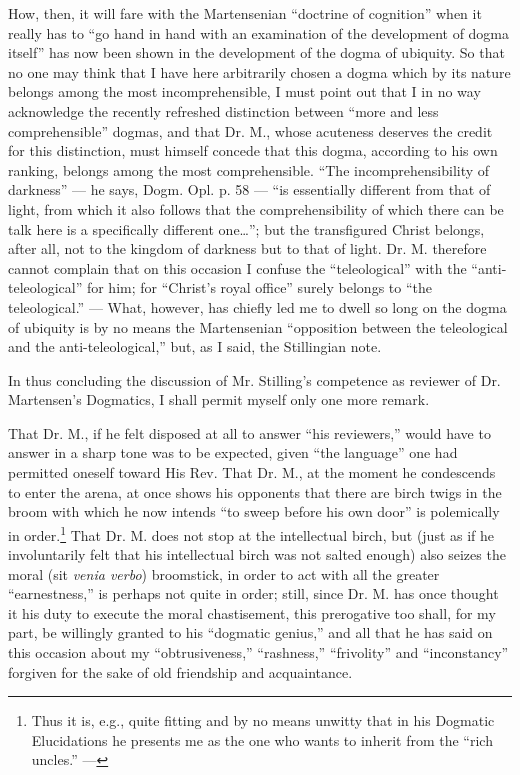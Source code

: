\documentclass[12pt,a4paper,openany]{book}
\newcommand{\opage}[1]{\marginnote{\footnotesize\textit{[#1]}}}
\begin{document}
How, then, it will fare with the Martensenian ``doctrine
of cognition'' when it really has to ``go hand in hand with
an examination of the development of dogma itself'' has now
been shown in the development of the dogma of ubiquity. So that
no one may think that I have here arbitrarily chosen a dogma
which by its nature belongs among the most incomprehensible,
I must point out that I in no way acknowledge the recently
refreshed distinction between ``more and less comprehensible''
dogmas, and that Dr. M., whose acuteness deserves the credit
for this distinction, must himself concede that this dogma,
according to his own ranking, belongs among the most comprehensible.
``The incomprehensibility of darkness'' --- he says, Dogm. Opl.
p. 58 --- ``is essentially different from that of light, from
which it also follows that the comprehensibility of which there
can be talk here is a specifically different one\dots{}''; but the
transfigured Christ belongs, after all, not to the kingdom of
darkness but to that of light. Dr. M. therefore cannot complain
that on this occasion I confuse the ``teleological'' with the
``anti-teleological'' for him; for ``Christ's royal office'' surely
belongs to ``the teleological.'' --- What, however, has chiefly
led me to dwell so long on the dogma of ubiquity is by no means
the Martensenian ``opposition between the teleological and the
anti-teleological,'' but, as I said, the Stillingian note.

In thus concluding the discussion of Mr. Stilling's
competence as reviewer of Dr. Martensen's Dogmatics, I shall
permit myself only one more remark.

\setcounter{footnote}{0}%
\opage{44}That Dr. M., if he felt disposed at all to answer ``his
reviewers,'' would have to answer in a sharp tone was to be
expected, given ``the language'' one had permitted oneself toward
His Rev. That Dr. M., at the moment he condescends to enter
the arena, at once shows his opponents that there are birch
twigs in the broom with which he now intends ``to sweep before
his own door'' is polemically in order.\footnote[1]{Thus it is, e.g., quite fitting and by no means unwitty that in his Dogmatic Elucidations he presents me as the one who wants to inherit from the ``rich uncles.'' ---} That Dr. M. does not stop
at the intellectual birch, but (just as if he involuntarily felt
that his intellectual birch was not salted enough) also seizes
the moral (sit \textit{venia verbo}) broomstick, in order to act
with all the greater ``earnestness,'' is perhaps not quite in
order; still, since Dr. M. has once thought it his duty to
execute the moral chastisement, this prerogative too shall, for
my part, be willingly granted to his ``dogmatic genius,''
and all that he has said on this occasion about my ``obtrusiveness,''
``rashness,'' ``frivolity'' and ``inconstancy'' forgiven for the
sake of old friendship and acquaintance.
\end{document}

